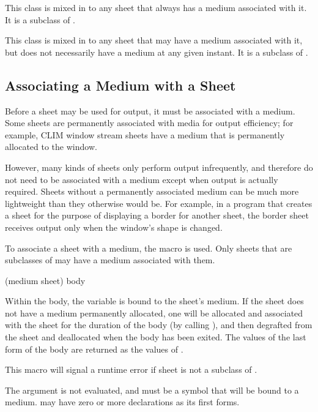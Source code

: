 This class is mixed in to any sheet that always has a medium associated with it.
It is a subclass of .


This class is mixed in to any sheet that may have a medium associated with it,
but does not necessarily have a medium at any given instant.  It is a subclass
of .


\subsection {Associating a Medium with a Sheet}

Before a sheet may be used for output, it must be associated with a medium.
Some sheets are permanently associated with media for output efficiency; for
example, CLIM window stream sheets have a medium that is permanently allocated
to the window.

However, many kinds of sheets only perform output infrequently, and therefore do
not need to be associated with a medium except when output is actually required.
Sheets without a permanently associated medium can be much more lightweight than
they otherwise would be.  For example, in a program that creates a sheet for the
purpose of displaying a border for another sheet, the border sheet receives
output only when the window's shape is changed.

To associate a sheet with a medium, the macro  is used.
Only sheets that are subclasses of  may have a
medium associated with them.


 {(medium sheet) \body body}

Within the body, the variable  is bound to the sheet's medium.  If
the sheet does not have a medium permanently allocated, one will be allocated
and associated with the sheet for the duration of the body (by calling
), and then degrafted from the sheet and deallocated when the
body has been exited.  The values of the last form of the body are returned as
the values of .

This macro will signal a runtime error if sheet is not a subclass of
.

The  argument is not evaluated, and must be a symbol that will be bound
to a medium.   may have zero or more declarations as its first forms.

